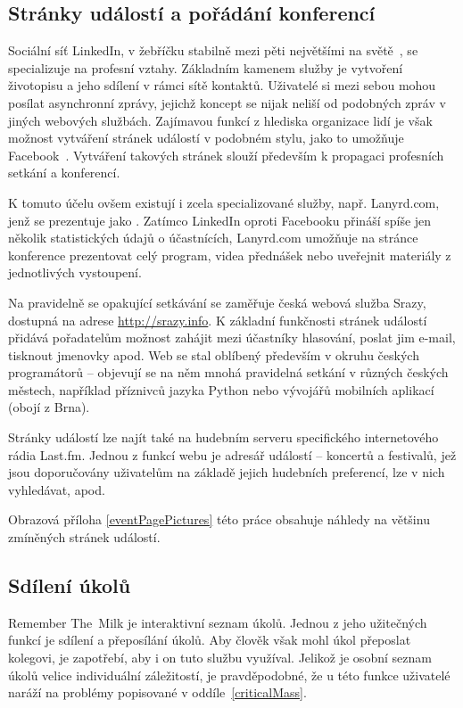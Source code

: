 \documentclass[12pt,oneside,final]{fithesis2}
\begin{document}
\subsection{Stránky událostí a pořádání konferencí}
Sociální síť LinkedIn, v žebříčku stabilně mezi pěti největšími na světě~\cite{kazeniac2009social}, se specializuje na profesní vztahy. Základním kamenem služby je vytvoření životopisu a jeho sdílení v rámci sítě kontaktů. Uživatelé si mezi sebou mohou posílat asynchronní zprávy, jejichž koncept se nijak neliší od podobných zpráv v jiných webových službách. Zajímavou funkcí z hlediska organizace lidí je však možnost vytváření stránek událostí v podobném stylu, jako to umožňuje Facebook~\cite{linkedin2011networking}. Vytváření takových stránek slouží především k propagaci profesních setkání a konferencí.

K tomuto účelu ovšem existují i zcela specializované služby, např. Lanyrd.com, jenž se prezentuje jako . Zatímco LinkedIn oproti Facebooku přináší spíše jen několik statistických údajů o účastnících, Lanyrd.com umožňuje na stránce konference prezentovat celý program, videa přednášek nebo uveřejnit materiály z jednotlivých vystoupení.

Na pravidelně se opakující setkávání se zaměřuje česká webová služba Srazy, dostupná na adrese \url{http://srazy.info}. K základní funkčnosti stránek událostí přidává pořadatelům možnost zahájit mezi účastníky hlasování, poslat jim e-mail, tisknout jmenovky apod. Web se stal oblíbený především v okruhu českých programátorů -- objevují se na něm mnohá pravidelná setkání v různých českých městech, například příznivců jazyka Python nebo vývojářů mobilních aplikací (obojí z Brna).

Stránky událostí lze najít také na hudebním serveru specifického internetového rádia Last.fm. Jednou z funkcí webu je adresář událostí -- koncertů a festivalů, jež jsou doporučovány uživatelům na základě jejich hudebních preferencí, lze v nich vyhledávat, apod.

Obrazová příloha \ref{eventPagePictures} této práce obsahuje náhledy na většinu zmíněných stránek událostí.

\subsection{Sdílení úkolů}
Remember The~Milk je interaktivní seznam úkolů. Jednou z jeho užitečných funkcí je sdílení a přeposílání úkolů. Aby člověk však mohl úkol přeposlat kolegovi, je zapotřebí, aby i on tuto službu využíval. Jelikož je osobní seznam úkolů velice individuální záležitostí, je pravděpodobné, že u této funkce uživatelé naráží na problémy popisované v oddíle~\ref{criticalMass}.
\end{document}
